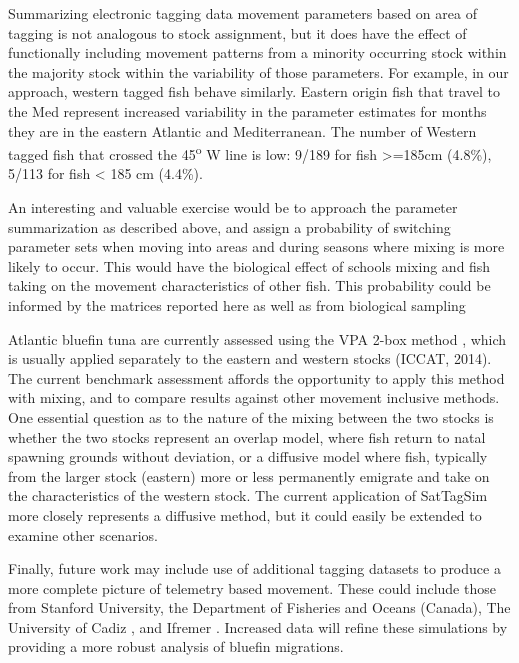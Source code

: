 \documentclass[
  authoryear,
  preprint,
  5p,
  onecolumn]{elsarticle}
\begin{document}
Summarizing electronic tagging data movement parameters based on area of
tagging is not analogous to stock assignment, but it does have the
effect of functionally including movement patterns from a minority
occurring stock within the majority stock within the variability of
those parameters. For example, in our approach, western tagged fish
behave similarly. Eastern origin fish that travel to the Med represent
increased variability in the parameter estimates for months they are in
the eastern Atlantic and Mediterranean. The number of Western tagged
fish that crossed the 45\textsuperscript{o} W line is low: 9/189 for
fish \textgreater=185cm (4.8\%), 5/113 for fish \textless{} 185 cm
(4.4\%).

An interesting and valuable exercise would be to approach the parameter
summarization as described above, and assign a probability of switching
parameter sets when moving into areas and during seasons where mixing is
more likely to occur. This would have the biological effect of schools
mixing and fish taking on the movement characteristics of other fish.
This probability could be informed by the matrices reported here as well
as from biological sampling
\citep[\emph{e.g.,}][]{rooker2014, graves2015, siskey2016}

Atlantic bluefin tuna are currently assessed using the VPA 2-box method
\citep{porch2003}, which is usually applied separately to the eastern
and western stocks (ICCAT, 2014). The current benchmark assessment
affords the opportunity to apply this method with mixing, and to compare
results against other movement inclusive methods. One essential question
as to the nature of the mixing between the two stocks is whether the two
stocks represent an overlap model, where fish return to natal spawning
grounds without deviation, or a diffusive model where fish, typically
from the larger stock (eastern) more or less permanently emigrate and
take on the characteristics of the western stock. The current
application of SatTagSim more closely represents a diffusive method, but
it could easily be extended to examine other scenarios.

Finally, future work may include use of additional tagging datasets to
produce a more complete picture of telemetry based movement. These could
include those from Stanford University, the Department of Fisheries and
Oceans (Canada), The University of Cadiz
\citep{abascal2016, aranda2013}, and Ifremer \citep{fromentin2013}.
Increased data will refine these simulations by providing a more robust
analysis of bluefin migrations.
\end{document}
